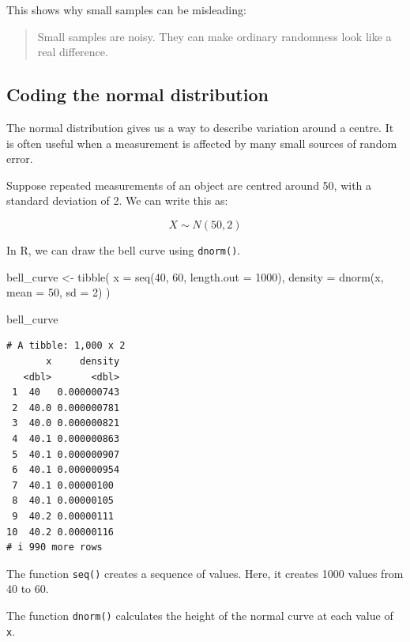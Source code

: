 \documentclass[
  letterpaper,
  DIV=11,
  numbers=noendperiod]{scrreprt}
\newenvironment{Shaded}{\begin{snugshade}}{\end{snugshade}}
\newcommand{\AttributeTok}[1]{\textcolor[rgb]{0.40,0.45,0.13}{#1}}
\newcommand{\DecValTok}[1]{\textcolor[rgb]{0.68,0.00,0.00}{#1}}
\newcommand{\FunctionTok}[1]{\textcolor[rgb]{0.28,0.35,0.67}{#1}}
\newcommand{\NormalTok}[1]{\textcolor[rgb]{0.00,0.23,0.31}{#1}}
\newcommand{\OtherTok}[1]{\textcolor[rgb]{0.00,0.23,0.31}{#1}}
\begin{document}
This shows why small samples can be misleading:

\begin{quote}
Small samples are noisy. They can make ordinary randomness look like a
real difference.
\end{quote}

\subsection{Coding the normal
distribution}\label{coding-the-normal-distribution}

The normal distribution gives us a way to describe variation around a
centre. It is often useful when a measurement is affected by many small
sources of random error.

Suppose repeated measurements of an object are centred around 50, with a
standard deviation of 2. We can write this as:

\[
X \sim N(50, 2)
\]

In R, we can draw the bell curve using \texttt{dnorm()}.

\begin{Shaded}
\begin{Highlighting}[]
\NormalTok{bell\_curve }\OtherTok{\textless{}{-}} \FunctionTok{tibble}\NormalTok{(}
  \AttributeTok{x =} \FunctionTok{seq}\NormalTok{(}\DecValTok{40}\NormalTok{, }\DecValTok{60}\NormalTok{, }\AttributeTok{length.out =} \DecValTok{1000}\NormalTok{),}
  \AttributeTok{density =} \FunctionTok{dnorm}\NormalTok{(x, }\AttributeTok{mean =} \DecValTok{50}\NormalTok{, }\AttributeTok{sd =} \DecValTok{2}\NormalTok{)}
\NormalTok{)}

\NormalTok{bell\_curve}
\end{Highlighting}
\end{Shaded}

\begin{verbatim}
# A tibble: 1,000 x 2
       x     density
   <dbl>       <dbl>
 1  40   0.000000743
 2  40.0 0.000000781
 3  40.0 0.000000821
 4  40.1 0.000000863
 5  40.1 0.000000907
 6  40.1 0.000000954
 7  40.1 0.00000100 
 8  40.1 0.00000105 
 9  40.2 0.00000111 
10  40.2 0.00000116 
# i 990 more rows
\end{verbatim}

The function \texttt{seq()} creates a sequence of values. Here, it
creates 1000 values from 40 to 60.

The function \texttt{dnorm()} calculates the height of the normal curve
at each value of \texttt{x}.
\end{document}
